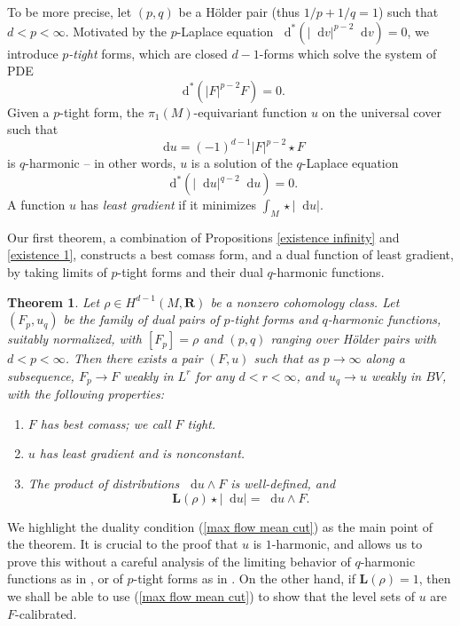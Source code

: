 \documentclass[reqno,11pt]{amsart}
\newcommand{\RR}{\mathbf{R}}
\newcommand*\dif{\mathop{}\!\mathrm{d}}
\newcommand{\Comass}{\mathbf L}
\newcommand{\dfn}[1]{\emph{#1}\index{#1}}
\newtheorem{mainthm}{Theorem}
\theoremstyle{definition}
\numberwithin{equation}{section}
\begin{document}
To be more precise, let $(p, q)$ be a H\"older pair (thus $1/p + 1/q = 1$) such that $d < p < \infty$.
Motivated by the $p$-Laplace equation $\dif^*(|\dif v|^{p - 2} \dif v) = 0$, we introduce \dfn{$p$-tight} forms, which are closed $d-1$-forms which solve the system of PDE
$$\dif^*(|F|^{p - 2} F) = 0.$$
Given a $p$-tight form, the $\pi_1(M)$-equivariant function $u$ on the universal cover such that
$$\dif u = (-1)^{d - 1} |F|^{p - 2} \star F$$
is $q$-harmonic -- in other words, $u$ is a solution of the $q$-Laplace equation 
$$\dif^*(|\dif u|^{q - 2} \dif u) = 0.$$
A function $u$ has \dfn{least gradient} if it minimizes $\int_M \star |\dif u|$.

Our first theorem, a combination of Propositions \ref{existence infinity} and \ref{existence 1}, constructs a best comass form, and a dual function of least gradient, by taking limits of $p$-tight forms and their dual $q$-harmonic functions.

\begin{mainthm}\label{existence of infinity tight forms}
Let $\rho \in H^{d - 1}(M, \RR)$ be a nonzero cohomology class.
Let $(F_p, u_q)$ be the family of dual pairs of $p$-tight forms and $q$-harmonic functions, suitably normalized, with $[F_p] = \rho$ and $(p, q)$ ranging over H\"older pairs with $d < p < \infty$.
Then there exists a pair $(F, u)$ such that as $p \to \infty$ along a subsequence, $F_p \to F$ weakly in $L^r$ for any $d < r < \infty$, and $u_q \to u$ weakly in $BV$, with the following properties:
\begin{enumerate}
\item $F$ has best comass; we call $F$ \dfn{tight}.
\item $u$ has least gradient and is nonconstant.
\item The product of distributions $\dif u \wedge F$ is well-defined, and
\begin{equation}\label{max flow mean cut}
\Comass(\rho) \star |\dif u| = \dif u \wedge F.
\end{equation}
\end{enumerate}
\end{mainthm}

We highlight the duality condition (\ref{max flow mean cut}) as the main point of the theorem.
It is crucial to the proof that $u$ is $1$-harmonic, and allows us to prove this without a careful analysis of the limiting behavior of $q$-harmonic functions as in \cite[Theorem 2.4]{Mazon14}, or of $p$-tight forms as in \cite[\S6]{daskalopoulos2020transverse}.
On the other hand, if $\Comass(\rho) = 1$, then we shall be able to use (\ref{max flow mean cut}) to show that the level sets of $u$ are $F$-calibrated.
\end{document}
